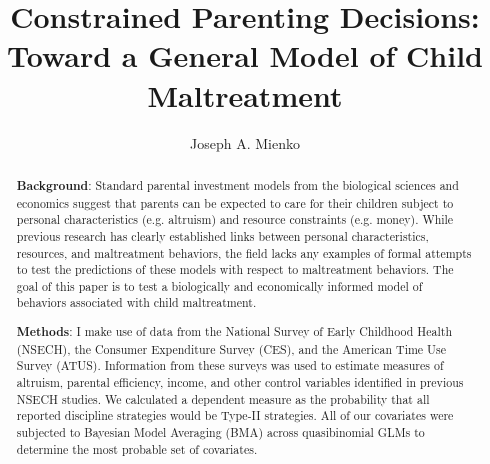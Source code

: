 \documentclass[1p, review]{elsarticle}\usepackage[]{graphicx}\usepackage[]{color}
\begin{document}
\begin{frontmatter}

  \title{Constrained Parenting Decisions:\\ Toward a General Model of Child Maltreatment}


  \author{Joseph A. Mienko}
  \address{University of Washington, School of Social Work}





  \begin{abstract}
  \textbf{Background}: Standard parental investment models from the biological sciences and economics suggest that parents can be expected to care for their children subject to personal characteristics (e.g. altruism) and resource constraints (e.g. money). While previous research has clearly established links between personal characteristics, resources, and maltreatment behaviors, the field lacks any examples of formal attempts to test the predictions of these models with respect to maltreatment behaviors. The goal of this paper is to test a biologically and economically informed model of behaviors associated with child maltreatment. 
  
  \textbf{Methods}: I make use of data from the National Survey of Early Childhood Health (NSECH), the Consumer Expenditure Survey (CES), and the American Time Use Survey (ATUS). Information from these surveys was used to estimate measures of altruism, parental efficiency, income, and other control variables identified in previous NSECH studies. We calculated a dependent measure as the probability that all reported discipline strategies would be Type-II strategies. All of our covariates were subjected to Bayesian Model Averaging (BMA) across quasibinomial GLMs to determine the most probable set of covariates.
  

\end{abstract}
\end{frontmatter}
\end{document}

